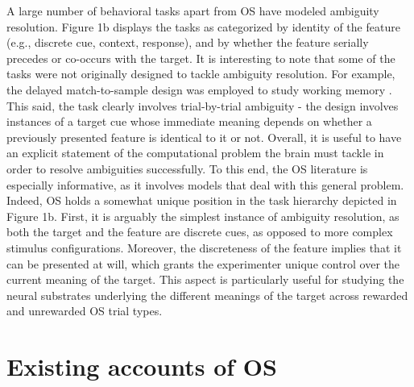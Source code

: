 \documentclass[11pt]{article}
\let\cite=\citep
\begin{document}
A large number of behavioral tasks apart from OS have modeled ambiguity 
resolution. Figure 1b displays the tasks as categorized by identity of the 
feature (e.g., discrete cue, context, response), and by whether the feature 
serially precedes or co-occurs with the target. It is interesting to note that 
some of the tasks were not originally designed to tackle ambiguity resolution. 
For example, the delayed match-to-sample design was employed to study working 
memory \cite{Miller1996}. This said, the task clearly involves trial-by-trial 
ambiguity - the design involves instances of a target cue whose immediate 
meaning depends on whether a previously presented feature is identical to it or 
not. Overall, it is useful to have an explicit statement of the computational 
problem the brain must tackle in order to resolve ambiguities successfully. To 
this end, the OS literature is especially informative, as it involves models 
that deal with this general problem. Indeed, OS holds a somewhat unique 
position in the task hierarchy depicted in Figure 1b. First, it is arguably the 
simplest instance of ambiguity resolution, as both the target and the feature 
are discrete cues, as opposed to more complex stimulus configurations. 
Moreover, the discreteness of the feature implies that it can be presented at 
will, which grants the experimenter unique control over the current meaning of 
the target. This aspect is particularly useful for studying the neural 
substrates underlying the different meanings of the target across rewarded and 
unrewarded OS trial types.

\section*{Existing accounts of OS}
\end{document}
